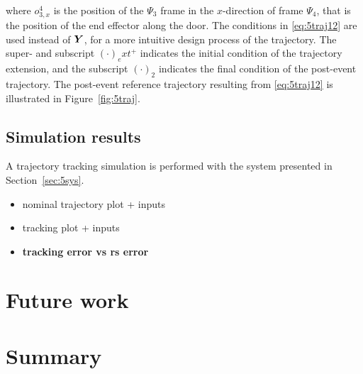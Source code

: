 \documentclass[../DC2019003Bouma.tex]{subfiles}
\begin{document}
where $o_{3,x}^4$ is the position of the $\Psi_3$ frame in the $x$-direction of frame $\Psi_4$, that is the position of the end effector along the door. The conditions in \eqref{eq:5traj12} are used instead of ${\boldsymbol{Y}}$, for a more intuitive design process of the trajectory. The super- and subscript $(\cdot)_ext^+$ indicates the initial condition of the trajectory extension, and the subscript $(\cdot)_2$ indicates the final condition of the post-event trajectory. The post-event reference trajectory resulting from \eqref{eq:5traj12} is illustrated in Figure~\ref{fig:5traj}.

\subsection{Simulation results}
A trajectory tracking simulation is performed with the system presented in Section~\ref{sec:5sys}.
\begin{itemize}
\item nominal trajectory plot + inputs
\item tracking plot + inputs
\item \textbf{tracking error vs rs error}
\end{itemize}

\section{Future work}


\section{Summary}
\end{document}

